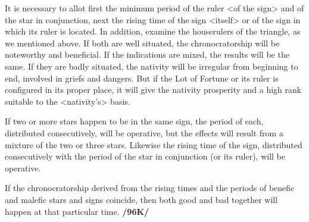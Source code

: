 It is necessary to allot first the minimum period of the ruler <of the sign> and of the star in conjunction, next the rising time of the sign <itself> or of the sign in which its ruler is located. In addition, examine the houserulers of the triangle, as we mentioned above. If both are well situated, the chronocratorship will be noteworthy and beneficial. If the indications are mixed, the results will be the same. If they are badly situated, the nativity will be irregular from beginning to end, involved in griefs and dangers. But if the Lot of Fortune or its ruler is configured in its proper place, it will give the nativity prosperity and a high rank suitable to the <nativity’s> basis. 

If two or more stars happen to be in the same sign, the period of each, distributed consecutively, will be operative, but the effects will result from a mixture of the two or three stars. Likewise the rising time of the sign, distributed consecutively with the period of the star in conjunction (or its ruler), will be operative. 

If the chronocratorship derived from the rising times and the periods of benefic and malefic stars and signs coincide, then both good and bad together will happen at that particular time. \textbf{/96K/}

\newpage